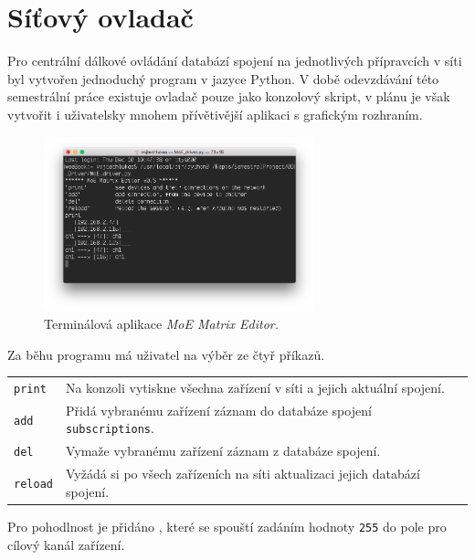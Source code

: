 \chapter{Síťový ovladač}
Pro centrální dálkové ovládání databází spojení na jednotlivých přípravcích v síti byl vytvořen jednoduchý program v jazyce Python. V době odevzdávání této semestrální práce existuje ovladač pouze jako konzolový skript, v plánu je však vytvořit i uživatelsky mnohem přívětivější aplikaci s grafickým rozhraním.

\begin{figure}[h]
    \centering
    \includegraphics[width=0.7\textwidth]{obrazky/MoE_editor_1.png}
    \caption{Terminálová aplikace \emph{MoE Matrix Editor.}}
    \label{fig:Driver_1}
\end{figure}

Za běhu programu má uživatel na výběr ze čtyř příkazů.
\begin{table}[h]
    \centering
        \begin{tabular}{l p{}}
            \texttt{print} & Na konzoli vytiskne všechna zařízení v síti a jejich aktuální spojení. \\
            \texttt{add} & Přidá vybranému zařízení záznam do databáze spojení \texttt{subscriptions}. \\
            \texttt{del} & Vymaže vybranému zařízení záznam z databáze spojení. \\
            \texttt{reload} & Vyžádá si po všech zařízeních na síti aktualizaci jejich databází spojení. \\
        \end{tabular}
\end{table}

Pro pohodlnost je přidáno , které se spouští zadáním hodnoty \texttt{255} do pole pro cílový kanál zařízení.
